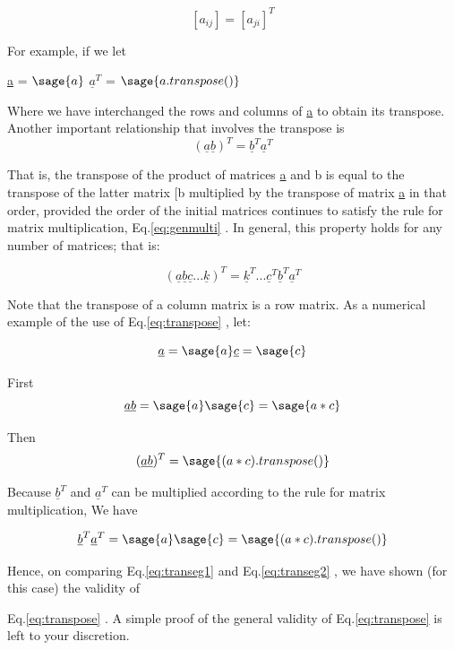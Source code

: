 \documentclass[12pt]{report}
\newcommand{\gen}[1]
{
	[#1_{{ij}}]
}
\newcommand{\lab}[1]{
	Eq.\ref{#1}
}
\begin{document}
\begin{equation}
	\gen{a} =[a_{{ji}}]^T
\end{equation}

For example, if we let
\begin{center}
	\underline{a} = $\sage{a}$
	$\underline{a}^T$ = $\sage{a.transpose()}$
\end{center}

Where we have interchanged the rows and columns of \underline{a} to
obtain its transpose.
Another important relationship that involves the
transpose is
\begin{equation}
	(\underline{a}\underline{b})^T = \underline{b}^T \underline{a}^T
	\label{eq:transpose}
\end{equation}

That is, the transpose of the product of matrices \underline{a} and
b is equal to the transpose of the latter matrix
[b multiplied by the transpose of matrix \underline{a} in
that order, provided the order of the initial matrices continues to
satisfy the rule for matrix multiplication,\lab{eq:genmulti}. In general,
this property holds for any number of matrices; that is:

\begin{equation}
	(\underline{a}\underline{b}\underline{c}...\underline{k})^T = \underline{k}^T... \underline{c}^T\underline{b}^T\underline{a}^T 
\end{equation} 

Note that the transpose of a column matrix is a row matrix. As a
numerical example of the use of \lab{eq:transpose}, let:

$$\underline{a} = \sage{a}  \underline{c} = \sage{c}$$

First$$\underline{a}\underline{b} = \sage{a}\sage{c}=\sage{a*c}$$

Then 
\begin{equation}
	(\underline{a}\underline{b})^T= \sage{(a*c).transpose()}
	\label{eq:transeg1}
\end{equation}

Because $\underline{b}^T$ and $\underline{a}^T$ can be multiplied
according to the rule for matrix multiplication, We have

\begin{equation}
	\underline{b}^T\underline{a}^T = \sage{a} \sage{c} = \sage{(a*c).transpose()}
	\label{eq:transeg2}
\end{equation}

Hence, on comparing \lab{eq:transeg1} and \lab{eq:transeg2}, 
we have shown (for this case) the validity of 
\lab{eq:transpose}. A simple proof of the general
validity of \lab{eq:transpose} is left to your discretion.
\end{document}
